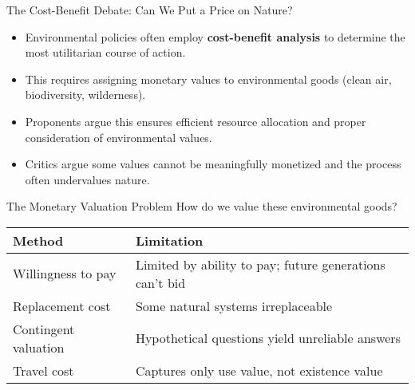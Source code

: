 \documentclass{beamer}
\begin{document}
	\begin{frame}{The Cost-Benefit Debate: Can We Put a Price on Nature?}
		\begin{itemize}
			\item Environmental policies often employ \textbf{cost-benefit analysis} to determine the most utilitarian course of action.
			\item This requires assigning monetary values to environmental goods (clean air, biodiversity, wilderness).
			\item Proponents argue this ensures efficient resource allocation and proper consideration of environmental values.
			\item Critics argue some values cannot be meaningfully monetized and the process often undervalues nature.
		\end{itemize}
		
		\begin{block}{The Monetary Valuation Problem}
			\scriptsize
			How do we value these environmental goods?
			\begin{tabular}{|p{}|p{}|}
				\hline
				\textbf{Method} & \textbf{Limitation} \\
				\hline
				Willingness to pay & Limited by ability to pay; future generations can't bid \\
				\hline
				Replacement cost & Some natural systems irreplaceable \\
				\hline
				Contingent valuation & Hypothetical questions yield unreliable answers \\
				\hline
				Travel cost & Captures only use value, not existence value \\
				\hline
			\end{tabular}
		\end{block}
	\end{frame}
	
\end{document}
